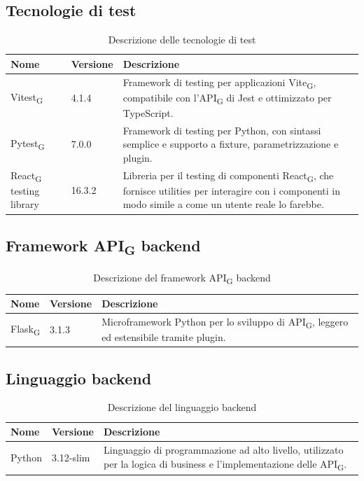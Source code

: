 \documentclass[11pt,a4paper]{article}
\newcommand{\gls}[1]{#1\textsubscript{G}}
\begin{document}
\subsection{Tecnologie di test}
\begin{table}[H]
    \centering
    \begin{tabular}{|p{}|p{}|p{}|}
        \hline
        \textbf{Nome} & \textbf{Versione} & \textbf{Descrizione} \\
        \hline
        \gls{Vitest} & 4.1.4 & Framework di testing per applicazioni \gls{Vite}, compatibile con l'\gls{API} di Jest e ottimizzato per TypeScript. \\
        \hline
        \gls{Pytest} & 7.0.0 & Framework di testing per Python, con sintassi semplice e supporto a fixture, parametrizzazione e plugin. \\
        \hline
        \gls{React} testing library & 16.3.2 & Libreria per il testing di componenti \gls{React}, che fornisce utilities per interagire con i componenti in modo simile a come un utente reale lo farebbe. \\
        \hline
    \end{tabular}
    \caption{Descrizione delle tecnologie di test}
    \label{tab:tecnologie_test}
\end{table}

\subsection{Framework \gls{API} backend}
\begin{table}[H]
    \centering
    \begin{tabular}{|p{}|p{}|p{}|}
        \hline
        \textbf{Nome} & \textbf{Versione} & \textbf{Descrizione} \\
        \hline
        \gls{Flask} & 3.1.3 & Microframework Python per lo sviluppo di \gls{API}, leggero ed estensibile tramite plugin. \\
        \hline
    \end{tabular}
    \caption{Descrizione del framework \gls{API} backend}
    \label{tab:api_backend}
\end{table}

\subsection{Linguaggio backend}
\begin{table}[H]
    \centering
    \begin{tabular}{|p{}|p{}|p{}|}
        \hline
        \textbf{Nome} & \textbf{Versione} & \textbf{Descrizione} \\
        \hline
        Python & 3.12-slim & Linguaggio di programmazione ad alto livello, utilizzato per la logica di business e l'implementazione delle \gls{API}. \\
        \hline
    \end{tabular}
    \caption{Descrizione del linguaggio backend}
    \label{tab:linguaggio_backend}
\end{table}
\end{document}

